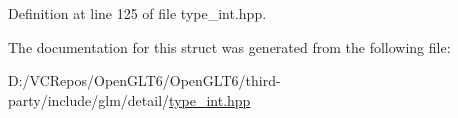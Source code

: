 Definition at line 125 of file type\+\_\+int.\+hpp.



The documentation for this struct was generated from the following file\+:\begin{DoxyCompactItemize}
\item 
D\+:/\+V\+C\+Repos/\+Open\+G\+L\+T6/\+Open\+G\+L\+T6/third-\/party/include/glm/detail/\mbox{\hyperlink{type__int_8hpp}{type\+\_\+int.\+hpp}}\end{DoxyCompactItemize}
